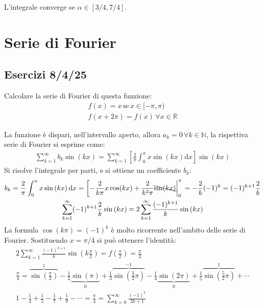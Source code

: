 \documentclass{article}
\newcommand{\df}{\mathrm{d}}
\numberwithin{equation}{subsection}
\begin{document}
L'integrale converge se $\alpha\in[3/4,7/4]$. 




\clearpage

\section{Serie di Fourier}

\subsection{Esercizi 8/4/25}

Calcolare la serie di Fourier di questa funzione:
\begin{gather*}
    f(x)=x\,\mbox{se}\,x\in[-\pi,\pi)\\
    f(x+2\pi)=f(x)\, \forall x\in\mathbb{R}
\end{gather*}


La funzione è dispari, nell'intervallo aperto, allora $a_k=0\,\forall k\in\mathbb{N}$, la rispettiva serie di Fourier si esprime come:
\begin{gather*}
    \displaystyle\sum_{k=1}^\infty b_k\sin\left(kx\right)=
    \displaystyle\sum_{k=1}^\infty\left[\frac{2}{\pi}\int_0^{\pi}x\sin\left(kx\right)\df x\right]\sin(kx)
\end{gather*}
Si risolve l'integrale per parti, e si ottiene un coefficiente $b_k$:
\begin{gather*}
    b_k=\frac{2}{\pi}\int_0^{\pi}x\sin\left(kx\right)\df x=\left[-\frac{2}{k\pi}x\cos(kx)+\frac{2}{k^2\pi}\bcancel{\sin(kx)}\bigg|_0^\pi\right.=-\frac{2}{k}(-1)^k=(-1)^{k+1}\frac{2}{k}\\
    \displaystyle\sum_{k=1}^\infty (-1)^{k+1}\frac{2}{k}\sin\left(kx\right)=
    2\sum_{k=1}^\infty \frac{(-1)^{k+1}}{k}\sin\left(kx\right)
\end{gather*}
La formula $\cos(k\pi)=(-1)^k$ è molto ricorrente nell'ambito delle serie di Fourier. Sostituendo $x=\pi/4$ si può ottenere l'identità:
\begin{gather*}
    2\sum_{k=1}^\infty \frac{(-1)^{k+1}}{k}\sin\left(k\frac{\pi}{2}\right)=f\left(\frac{\pi}{2}\right)=\frac{\pi}{2}\\
    \displaystyle\frac{\pi}{4}=\overbrace{\sin\left(\frac{\pi}{2}\right)}^1-\frac{1}{2}\underbrace{\sin(\pi)}_{0}+\frac{1}{3}\overbrace{\sin\left(\frac{3}{2}\pi\right)}^{-1}-\frac{1}{4}\underbrace{\sin(2\pi)}_0+\frac{1}{5}\overbrace{\sin\left(\frac{5}{2}\pi\right)}^1+\cdots\\
    \displaystyle1-\frac{1}{4}+\frac{1}{5}-\frac{1}{7}+\frac{1}{9}-\cdots=\frac{\pi}{4}=\displaystyle\sum_{k=0}^\infty\frac{(-1)^k}{2k+1}
\end{gather*}
\end{document}

